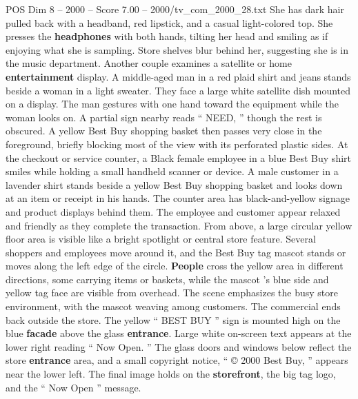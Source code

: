 \begin{textsample}{POS Dim 8 – 2000 – Score 7.00 – 2000/tv\_com\_2000\_28.txt}
She has dark hair pulled back with a headband, red lipstick, and a casual light-colored top.
She presses the \textbf{headphones} with both hands, tilting her head and smiling as if enjoying what she is sampling.
Store shelves blur behind her, suggesting she is in the music department.
Another couple examines a satellite or home \textbf{entertainment} display.
A middle-aged man in a red plaid shirt and jeans stands beside a woman in a light sweater.
They face a large white satellite dish mounted on a display.
The man gestures with one hand toward the equipment while the woman looks on.
A partial sign nearby reads “ NEED, ” though the rest is obscured.
A yellow Best Buy shopping basket then passes very close in the foreground, briefly blocking most of the view with its perforated plastic sides.
At the checkout or service counter, a Black female employee in a blue Best Buy shirt smiles while holding a small handheld scanner or device.
A male customer in a lavender shirt stands beside a yellow Best Buy shopping basket and looks down at an item or receipt in his hands.
The counter area has black-and-yellow signage and product displays behind them.
The employee and customer appear relaxed and friendly as they complete the transaction.
From above, a large circular yellow floor area is visible like a bright spotlight or central store feature.
Several shoppers and employees move around it, and the Best Buy tag mascot stands or moves along the left edge of the circle. \textbf{People} cross the yellow area in different directions, some carrying items or baskets, while the mascot ’s blue side and yellow tag face are visible from overhead.
The scene emphasizes the busy store environment, with the mascot weaving among customers.
The commercial ends back outside the store.
The yellow “ BEST BUY ” sign is mounted high on the blue \textbf{facade} above the glass \textbf{entrance}.
Large white on-screen text appears at the lower right reading “ Now Open. ” The glass doors and windows below reflect the store \textbf{entrance} area, and a small copyright notice, “ {\EmojiFont ©} 2000 Best Buy, ” appears near the lower left.
The final image holds on the \textbf{storefront}, the big tag logo, and the “ Now Open ” message.

\end{textsample}
